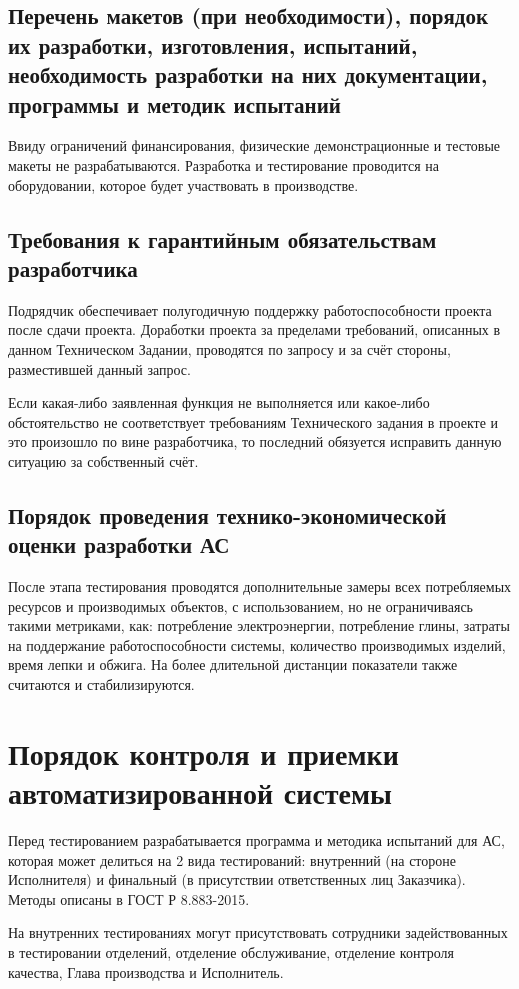 \documentclass[16pt,a4paper]{article}
\begin{document}
\subsection{Перечень макетов (при необходимости), порядок их разработки, изготовления, испытаний, необходимость разработки на них документации, программы и методик испытаний}
Ввиду ограничений финансирования, физические демонстрационные и тестовые макеты не разрабатываются. Разработка и тестирование проводится на оборудовании, которое будет участвовать в производстве.
\subsection{Требования к гарантийным обязательствам разработчика}
Подрядчик обеспечивает полугодичную поддержку работоспособности проекта после сдачи проекта. Доработки проекта за пределами требований, описанных в данном Техническом Задании, проводятся по запросу и за счёт стороны, разместившей данный запрос.

Если какая-либо заявленная функция не выполняется или какое-либо обстоятельство не соответствует требованиям Технического задания в проекте и это произошло по вине разработчика, то последний обязуется исправить данную ситуацию за собственный счёт.
\subsection{Порядок проведения технико-экономической оценки разработки АС}
После этапа тестирования проводятся дополнительные замеры всех потребляемых ресурсов и производимых объектов, с использованием, но не ограничиваясь такими метриками, как: потребление электроэнергии, потребление глины, затраты на поддержание работоспособности системы, количество производимых изделий, время лепки и обжига.
На более длительной дистанции показатели также считаются и стабилизируются. 

\section{Порядок контроля и приемки автоматизированной системы}
Перед тестированием разрабатывается программа и методика испытаний для АС, которая может делиться на 2 вида тестирований: внутренний (на стороне Исполнителя) и финальный (в присутствии ответственных лиц Заказчика). Методы описаны в  ГОСТ Р 8.883-2015. 

На внутренних тестированиях могут присутствовать сотрудники задействованных в тестировании отделений, отделение обслуживание, отделение контроля качества, Глава производства и Исполнитель.
\end{document}
